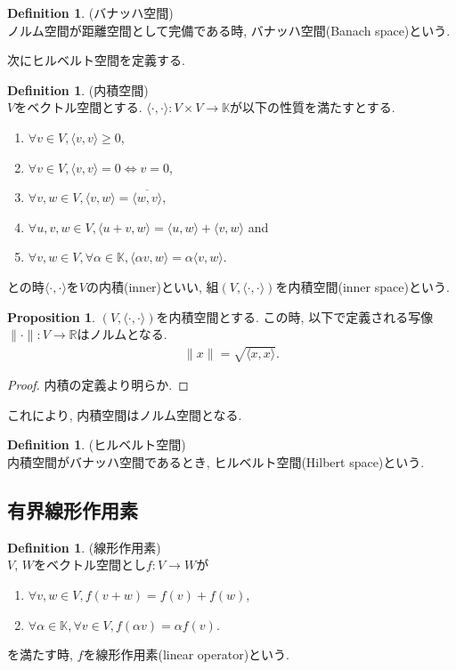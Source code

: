 \documentclass[11pt, a4paper, dvipdfmx]{jsarticle}
\theoremstyle{definition}
\def\inner<#1>{\langle #1 \rangle}
\newtheorem{Definition+}[Axiom+]{Definition}
\newtheorem{Proposition+}[Axiom+]{Proposition}
\newcommand{\R}{\mathbb{R}}
\newcommand{\K}{\mathbb{K}}
\newcommand{\innersp}{(V, \inner<\cdot, \cdot>)}
\begin{document}
\begin{Definition+}(バナッハ空間)\\
    ノルム空間が距離空間として完備である時, バナッハ空間(Banach space)という.
\end{Definition+}
次にヒルベルト空間を定義する.
\begin{Definition+}(内積空間)\\
    $V$をベクトル空間とする. $\inner<\cdot, \cdot>: V\times V\to\K$が以下の性質を満たすとする.
    \begin{enumerate}
        \item $\forall v\in V, \inner<v, v>\geq 0$,
        \item $\forall v\in V, \inner<v, v> = 0\iff v = 0$,
        \item $\forall v, w\in V, \inner<v, w> = \overline{\inner<w, v>}$,
        \item $\forall u, v, w\in V, \inner<u + v, w> = \inner<u, w> + \inner<v, w>$ and
        \item $\forall v, w\in V, \forall\alpha\in\K, \inner<\alpha v, w> = \alpha\inner<v, w>$.
    \end{enumerate}
    との時$\inner<\cdot, \cdot>$を$V$の内積(inner)といい, 組$(V, \inner<\cdot, \cdot>)$を内積空間(inner space)という.
\end{Definition+}
\begin{Proposition+}
    $\innersp$を内積空間とする. この時, 以下で定義される写像$\|\cdot\|:V\to\R$はノルムとなる.
    \begin{align*}
        \|x\| = \sqrt{\inner<x, x>}.
    \end{align*}
    \begin{proof}
        内積の定義より明らか.
    \end{proof}
\end{Proposition+}
これにより, 内積空間はノルム空間となる.
\begin{Definition+}(ヒルベルト空間)\\
    内積空間がバナッハ空間であるとき, ヒルベルト空間(Hilbert space)という.
\end{Definition+}
\subsection{有界線形作用素}
\begin{Definition+}(線形作用素)\\
    $V$, $W$をベクトル空間とし$f:V\to W$が
    \begin{enumerate}
        \item $\forall v, w\in V, f(v + w) = f(v) + f(w)$,
        \item $\forall\alpha\in\K, \forall v\in V, f(\alpha v) = \alpha f(v)$.
    \end{enumerate}
    を満たす時, $f$を線形作用素(linear operator)という.
\end{Definition+}
\end{document}
